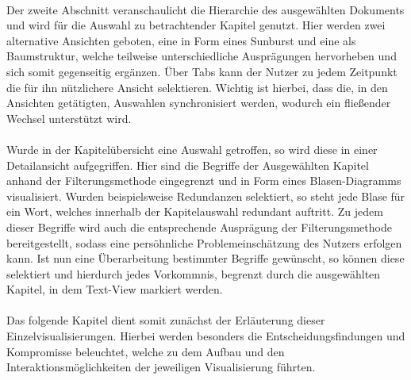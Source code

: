 \\
Der zweite Abschnitt veranschaulicht die Hierarchie des ausgew\"ahlten Dokuments und wird f\"ur die Auswahl zu betrachtender Kapitel genutzt. Hier werden zwei alternative Ansichten geboten, eine in Form eines Sunburst und eine als Baumstruktur, welche teilweise unterschiedliche Auspr\"agungen hervorheben und sich somit gegenseitig erg\"anzen. \"Uber Tabs kann der Nutzer zu jedem Zeitpunkt die f\"ur ihn n\"utzlichere Ansicht selektieren. Wichtig ist hierbei, dass die, in den Ansichten get\"atigten, Auswahlen synchronisiert werden, wodurch ein flie{\ss}ender Wechsel unterst\"utzt wird. \\
\\
Wurde in der Kapitel\"ubersicht eine Auswahl getroffen, so wird diese in einer Detailansicht aufgegriffen. Hier sind die Begriffe der Ausgew\"ahlten Kapitel anhand der Filterungsmethode eingegrenzt und in Form eines Blasen-Diagramms visualisiert. Wurden beispielsweise Redundanzen selektiert, so steht jede Blase f\"ur ein Wort, welches innerhalb der Kapitelauswahl redundant auftritt. Zu jedem dieser Begriffe wird auch die entsprechende Auspr\"agung der Filterungsmethode bereitgestellt, sodass eine pers\"ohnliche Problemeinsch\"atzung des Nutzers erfolgen kann. Ist nun eine \"Uberarbeitung bestimmter Begriffe gew\"unscht, so k\"onnen diese selektiert und hierdurch jedes Vorkommnis, begrenzt durch die ausgew\"ahlten Kapitel, in dem Text-View markiert werden.\\
\\
Das folgende Kapitel dient somit zun\"achst der Erl\"auterung dieser Einzelvisualisierungen. Hierbei werden besonders die Entscheidungsfindungen und Kompromisse beleuchtet, welche zu dem Aufbau und den Interaktionsm\"oglichkeiten der jeweiligen Visualisierung f\"uhrten.

